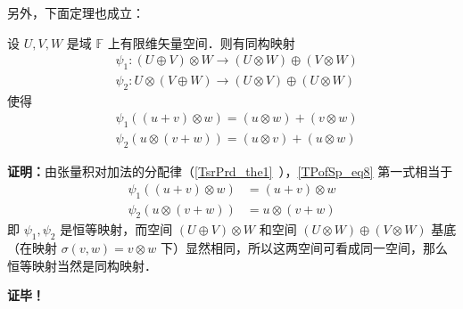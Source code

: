 另外，下面定理也成立：
\begin{theorem}{}
设 $U,V,W$ 是域 $\mathbb F$ 上有限维矢量空间．则有同构映射
\begin{equation}
\begin{aligned}
&\psi_1:(U\oplus V)\otimes W\rightarrow (U\otimes W)\oplus (V\otimes W) \\
&\psi_2:U\otimes(V\oplus W)\rightarrow (U\otimes V)\oplus (U\otimes W)
\end{aligned}
\end{equation}
使得
\begin{equation}\label{TPofSp_eq8}
\begin{aligned}
&\psi_1((u+v)\otimes w)=(u\otimes w)+ (v\otimes w)\\
&\psi_2(u\otimes (v+ w))=(u\otimes v)+ (u\otimes w) 
\end{aligned}
\end{equation}
\end{theorem}
\textbf{证明：}由张量积对加法的分配律（\autoref{TsrPrd_the1}~），\autoref{TPofSp_eq8} 第一式相当于
\begin{equation}
\begin{aligned}
\psi_1((u+v)\otimes w)&=(u+v)\otimes w\\
\psi_2(u\otimes(v+w))&=u\otimes(v+w)
\end{aligned}
\end{equation}
即 $\psi_1,\psi_2$ 是恒等映射，而空间 $(U\oplus V)\otimes W$ 和空间 $(U\otimes W)\oplus (V\otimes W) $ 基底（在映射 $\sigma(v,w)=v\otimes w$ 下）显然相同，所以这两空间可看成同一空间，那么恒等映射当然是同构映射．

\textbf{证毕！}
